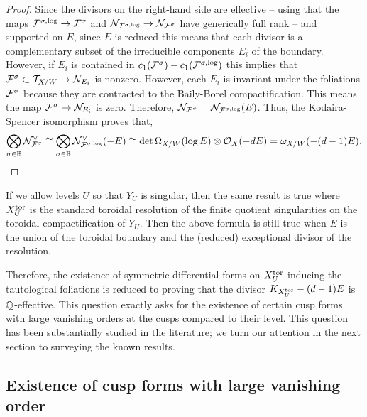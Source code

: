 \documentclass[main.tex]{subfiles}
\begin{document}
{\begin{proof}
Since the divisors on the right-hand side are effective -- using that the maps $\mathcal{F}^{\sigma,\log} \to \mathcal{F}^{\sigma}$ and $\mathcal{N}_{\mathcal{F}^{\sigma, \log}} \to \mathcal{N}_{\mathcal{F}^{\sigma}}$ have generically full rank -- and supported on $E$, since $E$ is reduced this means that each divisor is a complementary subset of the irreducible components $E_i$ of the boundary. However, if $E_i$ is contained in $c_1(\mathcal{F}^{\sigma}) - c_1(\mathcal{F}^{\sigma,\log})$ this implies that $\mathcal{F}^{\sigma} \subset \mathcal{T}_{X/W} \to \mathcal{N}_{E_i}$ is nonzero. However, each $E_i$ is invariant under the foliations $\mathcal{F}^{\sigma}$ because they are contracted to the Baily-Borel compactification. This means the map $\mathcal{F}^{\sigma} \to \mathcal{N}_{E_i}$ is zero. Therefore, $\mathcal{N}_{\mathcal{F}^{\sigma}} = \mathcal{N}_{\mathcal{F}^{\sigma, \log}}(E)$. Thus, the Kodaira-Spencer isomorphism proves that,
\[ \bigotimes_{\sigma \in \mathbb{B}} \mathcal{N}_{\mathcal{F}^{\sigma}}^{\vee} \cong \bigotimes_{\sigma \in \mathbb{B}} \mathcal{N}_{\mathcal{F}^{\sigma, \log}}^{\vee}(-E) \cong \det{\Omega_{X/W}(\log{E})} \otimes \mathcal{O}_{X}(-d E) = \omega_{X/W}(-(d-1)E). \]
\end{proof}

\begin{rmk}
If we allow levels $U$ so that $Y_U$ is singular, then the same result is true where $X_U^{\mathrm{tor}}$ is the standard toroidal resolution of the finite quotient singularities on the toroidal compactification of $Y_U$. Then the above formula is still true when $E$ is the union of the toroidal boundary and the (reduced) exceptional divisor of the resolution.
\end{rmk}

Therefore, the existence of symmetric differential forms on $X_U^{\mathrm{tor}}$ inducing the tautological foliations is reduced to proving that the divisor $K_{X_U^{\mathrm{tor}}} - (d-1) E$ is $\mathbb{Q}$-effective. This question exactly asks for the existence of certain cusp forms with large vanishing orders at the cusps compared to their level. This question has been substantially studied in the literature; we turn our attention in the next section to surveying the known results.

\subsection{Existence of cusp forms with large vanishing order}

}
\end{document}
